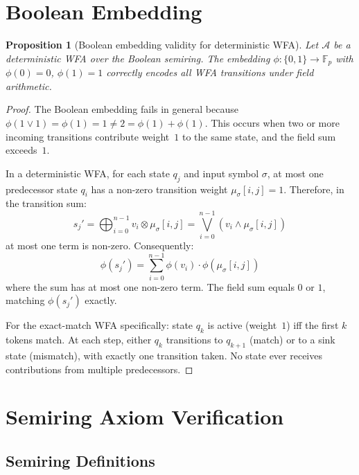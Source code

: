 \documentclass[11pt]{article}
\newtheorem{proposition}[theorem]{Proposition}
\newcommand{\F}{\mathbb{F}}
\newcommand{\wfa}{\mathcal{A}}
\begin{document}
\section{Boolean Embedding}\label{app:bool-embed}

\begin{proposition}[Boolean embedding validity for deterministic WFA]
\label{prop:bool-embed}
Let $\wfa$ be a deterministic WFA over the Boolean semiring.  The
embedding $\phi: \{0,1\} \to \F_p$ with $\phi(0)=0$, $\phi(1)=1$
correctly encodes all WFA transitions under field arithmetic.
\end{proposition}

\begin{proof}
The Boolean embedding fails in general because
$\phi(1 \lor 1) = \phi(1) = 1 \neq 2 = \phi(1) + \phi(1)$.
This occurs when two or more incoming transitions contribute
weight~$1$ to the same state, and the field sum exceeds~$1$.

In a deterministic WFA, for each state $q_j$ and input symbol $\sigma$,
at most one predecessor state $q_i$ has a non-zero transition weight
$\mu_\sigma[i,j] = 1$.  Therefore, in the transition sum:
\[
  s_j' = \bigoplus_{i=0}^{n-1} v_i \otimes \mu_\sigma[i,j]
  = \bigvee_{i=0}^{n-1} (v_i \land \mu_\sigma[i,j])
\]
at most one term is non-zero.  Consequently:
\[
  \phi(s_j') = \sum_{i=0}^{n-1} \phi(v_i) \cdot \phi(\mu_\sigma[i,j])
\]
where the sum has at most one non-zero term.  The field sum equals
$0$ or $1$, matching $\phi(s_j')$ exactly.

For the exact-match WFA specifically: state $q_k$ is active (weight~$1$)
iff the first $k$ tokens match.  At each step, either $q_k$ transitions
to $q_{k+1}$ (match) or to a sink state (mismatch), with exactly one
transition taken.  No state ever receives contributions from multiple
predecessors.
\end{proof}


\section{Semiring Axiom Verification}\label{app:semiring-verification}

\subsection{Semiring Definitions}
\end{document}
